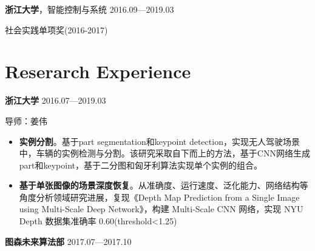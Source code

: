 \documentclass{article}
\begin{document}
\par \large \textbf{浙江大学}，智能控制与系统  \hfill 2016.09—2019.03
\linespread{1.6}\selectfont %
\par 社会实践单项奖(2016-2017)

\linespread{1.2}\selectfont %





\section*{Reserarch Experience}
\vspace{-1.3\baselineskip}
\noindent\hrulefill


\par \large \textbf{浙江大学}  \hfill 2016.07—2019.03
\linespread{1.6}\selectfont %

\linespread{1.2}\selectfont %
\par 导师：姜伟
\begin{itemize}
\item \textbf{实例分割}。基于part segmentation和keypoint detection，实现无人驾驶场景中，车辆的实例检测与分割。该研究采取自下而上的方法，基于CNN网络生成part和keypoint，基于二分图和匈牙利算法实现单个实例的组合。
\end{itemize}

\begin{itemize}
\item  \textbf{基于单张图像的场景深度恢复}。从准确度、运行速度、泛化能力、网络结构等角度分析领域研究进展，复现《Depth Map Prediction from a Single Image using Multi-Scale Deep Network》，构建 Multi-Scale CNN 网络，实现 NYU Depth 数据集准确率 0.60(threshold<1.25)
\end{itemize}


\par \large \textbf{图森未来算法部}  \hfill 2017.07—2017.10
\linespread{1.6}\selectfont %
\end{document}
